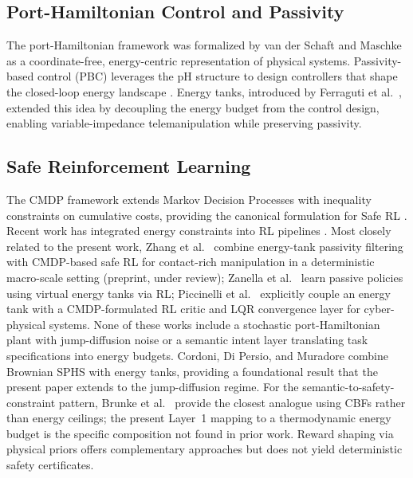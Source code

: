 \documentclass[11pt]{article}
\begin{document}
\subsection{Port-Hamiltonian Control and Passivity}

The port-Hamiltonian framework was formalized by van der Schaft and Maschke
\cite{vanderschaft1995,maschke1992} as a coordinate-free, energy-centric representation of
physical systems. Passivity-based control (PBC) leverages the pH structure to design
controllers that shape the closed-loop energy landscape \cite{vanderschaft2014,ortega2002}.
Energy tanks, introduced by Ferraguti et al.\ \cite{ferraguti2013,ferraguti2015}, extended
this idea by decoupling the energy budget from the control design, enabling variable-impedance
telemanipulation while preserving passivity.

\subsection{Safe Reinforcement Learning}

The CMDP framework \cite{altman1999} extends Markov Decision Processes with inequality
constraints on cumulative costs, providing the canonical formulation for Safe RL \cite{garcia2015}.
Recent work has integrated energy constraints into RL pipelines \cite{hsu2024}. Most closely
related to the present work, Zhang et al.\ \cite{zhang2025} combine energy-tank passivity
filtering with CMDP-based safe RL for contact-rich manipulation in a deterministic macro-scale
setting (preprint, under review); Zanella et al.\ \cite{zanella2024} learn passive policies using
virtual energy tanks via RL; Piccinelli et al.\ \cite{piccinelli2025} explicitly couple an energy
tank with a CMDP-formulated RL critic and LQR convergence layer for cyber-physical systems.
None of these works include a stochastic port-Hamiltonian plant with jump-diffusion noise or a
semantic intent layer translating task specifications into energy budgets. Cordoni, Di Persio,
and Muradore \cite{cordoni2021} combine Brownian SPHS with energy tanks, providing a
foundational result that the present paper extends to the jump-diffusion regime. For the
semantic-to-safety-constraint pattern, Brunke et al.\ \cite{brunke2025} provide the closest
analogue using CBFs rather than energy ceilings; the present Layer~1 mapping to a
thermodynamic energy budget is the specific composition not found in prior work. Reward
shaping via physical priors \cite{levine2016} offers complementary approaches but does not
yield deterministic safety certificates.
\end{document}
